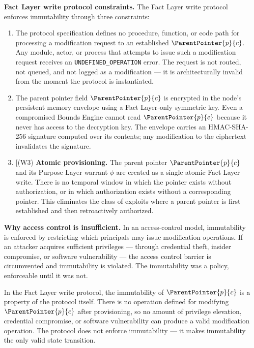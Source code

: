 \medskip
\noindent\textbf{Fact Layer write protocol constraints.} The Fact Layer write protocol enforces immutability through three constraints:

\begin{enumerate}
    \item[(W1) \textbf{No modification path.}] The protocol specification defines no procedure, function, or code path for processing a modification request to an established $\ParentPointer{p}{c}$. Any module, actor, or process that attempts to issue such a modification request receives an \texttt{UNDEFINED\_OPERATION} error. The request is not routed, not queued, and not logged as a modification --- it is architecturally invalid from the moment the protocol is instantiated.

    \item[(W2) \textbf{Sealed memory envelope.}] The parent pointer field $\ParentPointer{p}{c}$ is encrypted in the node's persistent memory envelope using a Fact Layer-only symmetric key. Even a compromised Bounds Engine cannot read $\ParentPointer{p}{c}$ because it never has access to the decryption key. The envelope carries an HMAC-SHA-256 signature computed over its contents; any modification to the ciphertext invalidates the signature.

    \item[(W3) \textbf{Atomic provisioning.} The parent pointer $\ParentPointer{p}{c}$ and its Purpose Layer warrant $\phi$ are created as a single atomic Fact Layer write. There is no temporal window in which the pointer exists without authorization, or in which authorization exists without a corresponding pointer. This eliminates the class of exploits where a parent pointer is first established and then retroactively authorized.
\end{enumerate}

\medskip
\noindent\textbf{Why access control is insufficient.} In an access-control model, immutability is enforced by restricting which principals may issue modification operations. If an attacker acquires sufficient privileges --- through credential theft, insider compromise, or software vulnerability --- the access control barrier is circumvented and immutability is violated. The immutability was a policy, enforceable until it was not.

In the Fact Layer write protocol, the immutability of $\ParentPointer{p}{c}$ is a property of the protocol itself. There is no operation defined for modifying $\ParentPointer{p}{c}$ after provisioning, so no amount of privilege elevation, credential compromise, or software vulnerability can produce a valid modification operation. The protocol does not enforce immutability --- it makes immutability the only valid state transition.


